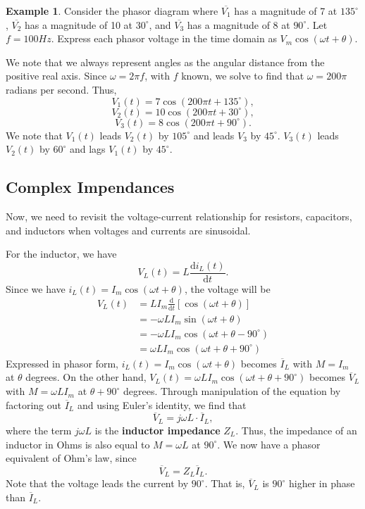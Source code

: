 \documentclass[11pt]{article}
\theoremstyle{plain} %
\theoremstyle{definition}
\theoremstyle{example}
\newtheorem*{example}{Example}
\theoremstyle{remark}
\begin{document}
\begin{example}
Consider the phasor diagram where $\overline{V_1}$ has a magnitude of 7 at $135^{\circ}$, $\overline{V_2}$ has a magnitude of 10 at $30^{\circ}$, and $\overline{V_3}$ has a magnitude of 8 at $90^{\circ}$. Let $f=100Hz$. Express each phasor voltage in the time domain as $V_m\cos\left(\omega t + \theta\right)$. 
\end{example}

We note that we always represent angles as the angular distance from the positive real axis. Since $\omega = 2\pi f$, with $f$ known, we solve to find that $\omega = 200\pi$ radians per second. Thus, 
$$V_1(t) = 7\cos\left(200\pi t + 135^{\circ}\right),$$
$$V_2(t) = 10\cos\left(200\pi t + 30^{\circ}\right),$$
$$V_3(t) = 8\cos\left(200\pi t + 90^{\circ}\right).$$
We note that $V_1(t)$ leads $V_2(t)$ by $105^{\circ}$ and leads $V_3$ by $45^{\circ}$. $V_3(t)$ leads $V_2(t)$ by $60^{\circ}$ and lags $V_1(t)$ by $45^{\circ}$. 

\subsection{Complex Impendances}
Now, we need to revisit the voltage-current relationship for resistors, capacitors, and inductors when voltages and currents are sinusoidal. 

For the inductor, we have 
$$V_L(t)  = L\frac{\mathrm d i_L(t)}{\mathrm d t}.$$
Since we have $i_L(t) = I_m\cos(\omega t + \theta)$, the voltage will be 
\begin{align*}
V_L(t) &= LI_m\frac{\mathrm d }{\mathrm d t}\left[\cos(\omega t + \theta)\right]\\
	&= -\omega LI_m\sin(\omega t + \theta)\\
	&= -\omega LI_m\cos\left(\omega t + \theta - 90^{\circ}\right)\\
	&= \omega LI_m\cos\left(\omega t + \theta + 90^{\circ}\right)
\end{align*}
Expressed in phasor form, $i_L(t) = I_m\cos(\omega t + \theta)$ becomes $\overline{I}_L$ with $M = I_m$ at $\theta$ degrees. On the other hand, $V_L(t) = \omega LI_m\cos\left(\omega t + \theta + 90^{\circ}\right)$ becomes $\overline{V}_L$ with $M = \omega LI_m$ at $\theta + 90^{\circ}$ degrees. 
Through manipulation of the equation by factoring out $\overline{I}_L$ and using Euler's identity, we find that 
$$\overline{V}_L = j\omega L \cdot \overline{I}_L,$$
where the term $j\omega L$ is the \textbf{inductor impedance} $Z_L$. Thus, the impedance of an inductor in Ohms is also equal to $M = \omega L$ at $90^{\circ}$. We now have a phasor equivalent of  Ohm's law, since 
$$\overline{V}_L = Z_L\overline{I}_L.$$
Note that the voltage leads the current by $90^{\circ}$. That is, $\overline{V}_L$ is $90^{\circ}$ higher in phase than $\overline{I}_L$. 
\end{document}

